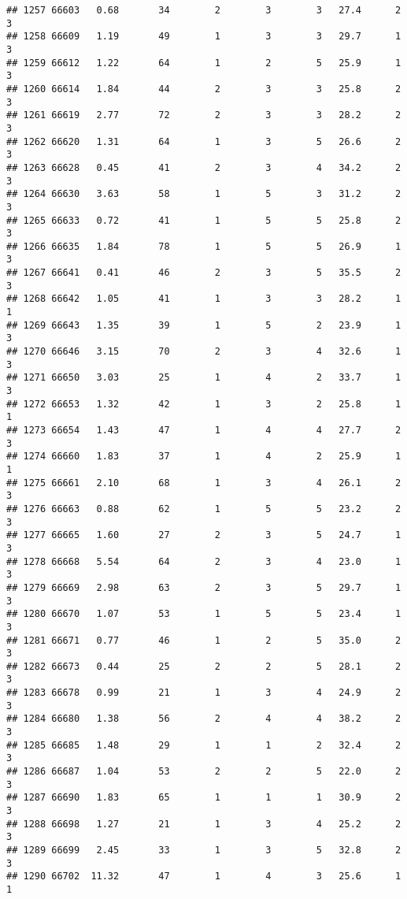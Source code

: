 \documentclass[
]{article}
\begin{document}
\begin{verbatim}
## 1257 66603   0.68       34        2        3        3   27.4      2      3
## 1258 66609   1.19       49        1        3        3   29.7      1      3
## 1259 66612   1.22       64        1        2        5   25.9      1      3
## 1260 66614   1.84       44        2        3        3   25.8      2      3
## 1261 66619   2.77       72        2        3        3   28.2      2      3
## 1262 66620   1.31       64        1        3        5   26.6      2      3
## 1263 66628   0.45       41        2        3        4   34.2      2      3
## 1264 66630   3.63       58        1        5        3   31.2      2      3
## 1265 66633   0.72       41        1        5        5   25.8      2      3
## 1266 66635   1.84       78        1        5        5   26.9      1      3
## 1267 66641   0.41       46        2        3        5   35.5      2      3
## 1268 66642   1.05       41        1        3        3   28.2      1      1
## 1269 66643   1.35       39        1        5        2   23.9      1      3
## 1270 66646   3.15       70        2        3        4   32.6      1      3
## 1271 66650   3.03       25        1        4        2   33.7      1      3
## 1272 66653   1.32       42        1        3        2   25.8      1      1
## 1273 66654   1.43       47        1        4        4   27.7      2      3
## 1274 66660   1.83       37        1        4        2   25.9      1      1
## 1275 66661   2.10       68        1        3        4   26.1      2      3
## 1276 66663   0.88       62        1        5        5   23.2      2      3
## 1277 66665   1.60       27        2        3        5   24.7      1      3
## 1278 66668   5.54       64        2        3        4   23.0      1      3
## 1279 66669   2.98       63        2        3        5   29.7      1      3
## 1280 66670   1.07       53        1        5        5   23.4      1      3
## 1281 66671   0.77       46        1        2        5   35.0      2      3
## 1282 66673   0.44       25        2        2        5   28.1      2      3
## 1283 66678   0.99       21        1        3        4   24.9      2      3
## 1284 66680   1.38       56        2        4        4   38.2      2      3
## 1285 66685   1.48       29        1        1        2   32.4      2      3
## 1286 66687   1.04       53        2        2        5   22.0      2      3
## 1287 66690   1.83       65        1        1        1   30.9      2      3
## 1288 66698   1.27       21        1        3        4   25.2      2      3
## 1289 66699   2.45       33        1        3        5   32.8      2      3
## 1290 66702  11.32       47        1        4        3   25.6      1      1

\end{verbatim}
\end{document}
